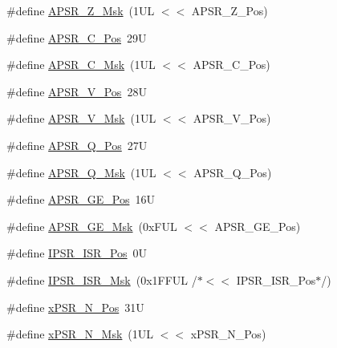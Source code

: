 \begin{DoxyCompactItemize}
\#define \mbox{\hyperlink{group___c_m_s_i_s___c_o_r_e_ga1deb4d1aa72bb83d1f79329406f15711}{A\+P\+S\+R\+\_\+\+Z\+\_\+\+Msk}}~(1\+U\+L $<$$<$ A\+P\+S\+R\+\_\+\+Z\+\_\+\+Pos)
\item 
\#define \mbox{\hyperlink{group___c_m_s_i_s___c_o_r_e_ga6cf72aa6f09a168f9e5beda1a4a887b9}{A\+P\+S\+R\+\_\+\+C\+\_\+\+Pos}}~29U
\item 
\#define \mbox{\hyperlink{group___c_m_s_i_s___c_o_r_e_ga6d47803fbad455bc10bd1ce59f2f335d}{A\+P\+S\+R\+\_\+\+C\+\_\+\+Msk}}~(1\+U\+L $<$$<$ A\+P\+S\+R\+\_\+\+C\+\_\+\+Pos)
\item 
\#define \mbox{\hyperlink{group___c_m_s_i_s___c_o_r_e_gac62830f67679ccd11658c4172c3e6ea7}{A\+P\+S\+R\+\_\+\+V\+\_\+\+Pos}}~28U
\item 
\#define \mbox{\hyperlink{group___c_m_s_i_s___c_o_r_e_ga33305d6701356bff6890b315fe8b5489}{A\+P\+S\+R\+\_\+\+V\+\_\+\+Msk}}~(1\+U\+L $<$$<$ A\+P\+S\+R\+\_\+\+V\+\_\+\+Pos)
\item 
\#define \mbox{\hyperlink{group___c_m_s_i_s___c_o_r_e_ga298749e176f12827328bb7b92a6b2411}{A\+P\+S\+R\+\_\+\+Q\+\_\+\+Pos}}~27U
\item 
\#define \mbox{\hyperlink{group___c_m_s_i_s___c_o_r_e_ga90ffd4ec4149c2f5dd7747c1533fb002}{A\+P\+S\+R\+\_\+\+Q\+\_\+\+Msk}}~(1\+U\+L $<$$<$ A\+P\+S\+R\+\_\+\+Q\+\_\+\+Pos)
\item 
\#define \mbox{\hyperlink{group___c_m_s_i_s___c_o_r_e_ga722cb42b5c75af3e8909fac6fd40dfdc}{A\+P\+S\+R\+\_\+\+G\+E\+\_\+\+Pos}}~16U
\item 
\#define \mbox{\hyperlink{group___c_m_s_i_s___c_o_r_e_ga8a3ecbc0ea2029462b0f4ce50e227db1}{A\+P\+S\+R\+\_\+\+G\+E\+\_\+\+Msk}}~(0x\+F\+U\+L $<$$<$ A\+P\+S\+R\+\_\+\+G\+E\+\_\+\+Pos)
\item 
\#define \mbox{\hyperlink{group___c_m_s_i_s___c_o_r_e_ga0e34027584d02c43811ae908a5ca9adf}{I\+P\+S\+R\+\_\+\+I\+S\+R\+\_\+\+Pos}}~0U
\item 
\#define \mbox{\hyperlink{group___c_m_s_i_s___c_o_r_e_gaf013a4579a64d1f21f56ea9f1b33ab56}{I\+P\+S\+R\+\_\+\+I\+S\+R\+\_\+\+Msk}}~(0x1\+F\+F\+U\+L /$\ast$$<$$<$ I\+P\+S\+R\+\_\+\+I\+S\+R\+\_\+\+Pos$\ast$/)
\item 
\#define \mbox{\hyperlink{group___c_m_s_i_s___c_o_r_e_ga031eb1b8ebcdb3d602d0b9f2ec82a7ae}{x\+P\+S\+R\+\_\+\+N\+\_\+\+Pos}}~31U
\item 
\#define \mbox{\hyperlink{group___c_m_s_i_s___c_o_r_e_gaf600f4ff41b62cf2f3b0a59b6d2e93d6}{x\+P\+S\+R\+\_\+\+N\+\_\+\+Msk}}~(1\+U\+L $<$$<$ x\+P\+S\+R\+\_\+\+N\+\_\+\+Pos)
\item 

\end{DoxyCompactItemize}
